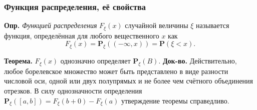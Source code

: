 \documentclass[oneside,final,14pt]{extreport}
\newcommand\mydef{{\bf Опр.}}
\newcommand\myth{{\bf Теорема.}}
\newcommand\myqed{{\bf Док-во.}}
\theoremstyle{definition}
\begin{document}
\subsubsection{Функция распределения, её свойства}

\mydef{} {\it Функцией распределения} $F_\xi (x)$ случайной величины $\xi$ называется функция, определённая для любого вещественного $x$ как
$$F_{\xi}(x)=\mathbf{P}_{\xi}((-\infty, x))=\mathbf{P}(\xi<x).$$

\myth{} $F_\xi(x)$ однозначно определяет $\mathbf{P}_\xi(B)$.
\myqed{} Действительно, любое борелевское множество может быть представлено в виде разности числовой оси, одной или двух полупрямых и не более чем счётного объединения отрезков. В силу однозначности определения $\mathbf{P}_\xi([a,b]) = F_\xi(b + 0) - F_\xi(a)$ утверждение теоремы справедливо.
\end{document}
